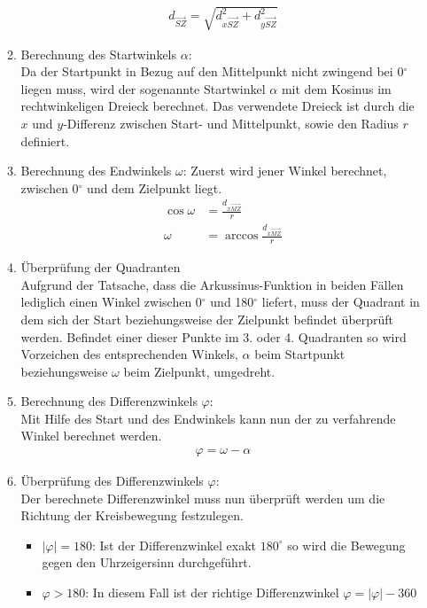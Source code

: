 \begin{itemize}
\begin{enumerate}
\begin{align*}
d_{\overrightarrow{SZ}} = \sqrt{d_{x\overrightarrow{SZ}}^2 + d_{y\overrightarrow{SZ}}^2}
\end{align*}
\item Berechnung des Startwinkels $\alpha$:\\
Da der Startpunkt in Bezug auf den Mittelpunkt nicht zwingend bei 0$^\circ$ liegen muss, wird der sogenannte Startwinkel $\alpha$ mit dem Kosinus im rechtwinkeligen Dreieck berechnet. Das verwendete Dreieck ist durch die $x$ und $y$-Differenz zwischen Start- und Mittelpunkt, sowie den Radius $r$ definiert.
\item Berechnung des Endwinkels $\omega$:
Zuerst wird jener Winkel berechnet, zwischen 0$^\circ$ und dem Zielpunkt liegt.
\begin{align*}
\cos \omega & = \frac{d_{x\overrightarrow{MZ}}}{r}\\
\omega & = \arccos \frac{d_{x\overrightarrow{MZ}}}{r}
\end{align*}
\item Überprüfung der Quadranten\\
Aufgrund der Tatsache, dass die Arkussinus-Funktion in beiden Fällen lediglich einen Winkel zwischen 0$^\circ$ und 180$^\circ$ liefert, muss der Quadrant in dem sich der Start beziehungsweise der Zielpunkt befindet überprüft werden. Befindet einer dieser Punkte  im 3. oder 4. Quadranten so wird Vorzeichen des entsprechenden Winkels, $\alpha$ beim Startpunkt beziehungsweise $\omega$ beim Zielpunkt, umgedreht. 
\newpage
\item Berechnung des Differenzwinkels $\varphi$:\\
Mit Hilfe des Start und des Endwinkels kann nun der zu verfahrende Winkel berechnet werden.
\begin{align*}
\varphi = \omega - \alpha
\end{align*}
\item Überprüfung des Differenzwinkels $\varphi$:\\
Der berechnete Differenzwinkel muss nun überprüft werden um die Richtung der Kreisbewegung festzulegen.
\begin{itemize}
\item $|\varphi| = 180$: Ist der Differenzwinkel exakt $180^\circ$ so wird die Bewegung gegen den Uhrzeigersinn durchgeführt.
\item $\varphi > 180$: In diesem Fall ist der richtige Differenzwinkel $\varphi = |\varphi| - 360$
\end{itemize}
\begin{align*}

\end{align*}
\end{enumerate}
\end{itemize}
